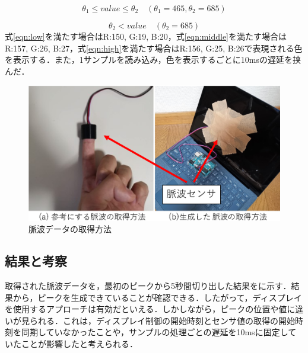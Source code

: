 \documentclass[submit,techrep]{ipsj}
\begin{document}
\begin{equation}
	\label{eqn:middle}
	\theta_{1} \leq value \leq \theta_{2} \quad (\theta_{1}=465, \theta_{2}=685)
\end{equation}

\begin{equation}
	\label{eqn:high}
	\theta_{2} < value \quad (\theta_{2}=685)
\end{equation}
式\ref{eqn:low}を満たす場合はR:150, G:19, B:20，式\ref{eqn:middle}を満たす場合はR:157, G:26, B:27，式\ref{eqn:high}を満たす場合はR:156, G:25, B:26で表現される色を表示する．また，1サンプルを読み込み，色を表示するごとに10msの遅延を挟んだ．

\begin{figure}[!t]
	\begin{center}
		\includegraphics[width=1\linewidth]{figures/sensors.eps}
	\end{center}
	\caption{脈波データの取得方法}
	\label{fig:sensors}
\end{figure}


\subsection{結果と考察}
取得された脈波データを，最初のピークから5秒間切り出した結果をに示す．結果から，ピークを生成できていることが確認できる．したがって，ディスプレイを使用するアプローチは有効だといえる．しかしながら，ピークの位置や値に違いが見られる．これは，ディスプレイ制御の開始時刻とセンサ値の取得の開始時刻を同期していなかったことや，サンプルの処理ごとの遅延を10msに固定していたことが影響したと考えられる．
\end{document}
